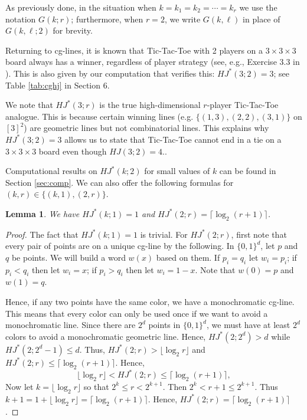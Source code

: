 \documentclass[11pt]{article}
\newtheorem{lemma}[thm]{Lemma}
\theoremstyle{definition}
\begin{document}
As previously done, in the situation when $k=k_1=k_2=\cdots=k_r$
we use the notation $G(k;r)$; furthermore,
when $r = 2$, we  write $G(k,\ell)$ in place of $G(k,\ell;2)$ for brevity.


Returning to cg-lines, it is known that Tic-Tac-Toe with 2 players on a
$3 \times 3 \times 3$ board always has a winner, regardless
of player strategy (see, e.g., Exercise 3.3 in \cite{Beck}).
This is also given by our computation that verifies this: $HJ^*(3;2)=3$; see Table \ref{tab:cghj} in Section 6.

We note that $HJ^*(3;r)$ is the true high-dimensional $r$-player Tic-Tac-Toe analogue. This is because certain winning lines (e.g. $\{(1,3), (2,2), (3,1)\}$ on $[3]^2$) are geometric lines but not combinatorial lines. This explains why $HJ^*(3;2) = 3$ allows us to state that Tic-Tac-Toe cannot end in a tie on a $3 \times 3 \times 3$
board even though $HJ(3;2)=4$..


Computational results on $HJ^*(k;2)$ for small values
of $k$ can be found in Section \ref{sec:comp}.
We can also offer the following formulas for
$(k,r) \in \{(k,1), (2,r)\}$.


\begin{lemma}\label{lem13}  We have
$HJ^*(k;1)=1$  
and
$HJ^*(2;r) = \lceil \log_2 (r+1)\rceil$.
\end{lemma}



\begin{proof}
The fact that $HJ^*(k;1)=1$ is trivial.
For $HJ^*(2;r)$, first
note that every pair of points are on a unique cg-line
by the following.  In $\{0,1\}^d$, let $p$ and $q$ be points.  We will build a word $w(x)$ based on them.
If $p_i=q_i$ let $w_i=p_i$; if $p_i<q_i$ then let $w_i=x$; if $p_i>q_i$ then let $w_i=1-x$.
Note that $w(0)=p$ and $w(1)=q$.  

Hence, if any two points have the same color, we have a monochromatic cg-line.
This means that every color can only be used once if we want to avoid
a monochromatic line.  Since there are $2^d$ points in $\{0,1\}^d$,
we must have at least $2^d$ colors to avoid a monochromatic geometric line.
Hence, $HJ^*(2;2^d) > d$ while $HJ^*(2;2^d-1) \leq d$. Thus,
$HJ^*(2;r) > \lfloor \log_2 r \rfloor $ and $HJ^*(2;r) \leq \lceil \log_2 (r+1)\rceil$.  Hence,
$$
\lfloor \log_2 r \rfloor < HJ^*(2;r) \leq \lceil \log_2 (r+1)\rceil,
$$
Now let $k=\lfloor \log_2 r \rfloor $ so that $2^k \leq r < 2^{k+1}$.  Then $2^k<r+1 \leq 2^{k+1}$.
Thus $k+1=1+\lfloor \log_2 r \rfloor =\lceil \log_2 (r+1)\rceil$.
Hence, $HJ^*(2;r)=\lceil \log_2 (r+1)\rceil$.
\end{proof}
\end{document}
